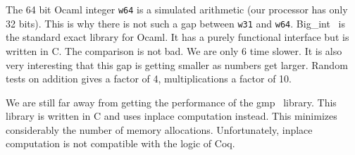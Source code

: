 The 64 bit {\sc Ocaml} integer {\tt w64} is a simulated arithmetic (our processor has only 32 bits).
This is why there is not such a gap between {\tt w31} and {\tt w64}. {\sc Big\_int}~\cite{bignum} is the  
standard exact library for {\sc Ocaml}. It has a purely functional interface but 
is written in C. The comparison is not bad. We are only 6 time slower. It is also very interesting
that this gap is getting smaller as numbers get larger. Random tests on addition gives a factor of
4, multiplications a factor of 10.

We are still far away from getting the performance of the {\sc gmp}~\cite{GMP} library. This library is written in
C and uses inplace computation instead. This minimizes considerably the number of memory allocations.
Unfortunately, inplace computation is not compatible with the logic of {\sc Coq}.

